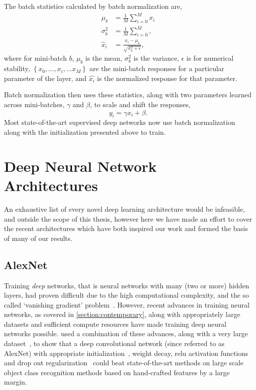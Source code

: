 \documentclass[thesis]{subfiles}
\begin{document}

The batch statistics calculated by batch normalization are,
\begin{equation}
\begin{aligned}
    \mu_b &= \frac{1}{M} \sum^M_{i=0} x_i\\
    \sigma^2_b &= \frac{1}{M} \sum^M_{i=0},\\
    \hat{x}_i &= \frac{x_i - \mu_b}{\sqrt{\sigma^2_b + \epsilon}},
\end{aligned}
\end{equation}
where for mini-batch $b$, $\mu_b$ is the mean, $\sigma^2_b$ is the variance, $\epsilon$ is for numerical stability, $\left\{x_0, \ldots, x_i, \ldots x_M\right\}$ are the mini-batch responses for a particular parameter of the layer, and $\hat{x_i}$ is the normalized response for that parameter. 

Batch normalization then uses these statistics, along with two parameters learned across mini-batches, $\gamma$ and $\beta$, to scale and shift the responses,
\begin{equation}    
    y_i = \gamma \hat{x_i} + \beta.
\end{equation}
%
Most state-of-the-art supervised deep networks now use batch normalization along with the initialization presented above to train.
\section{Deep Neural Network Architectures}
An exhaustive list of every novel deep learning architecture would be infeasible, and outside the scope of this thesis, however here we have made an effort to cover the recent architectures which have both inspired our work and formed the basis of many of our results.

\subsection{AlexNet}
Training \emph{deep} networks, that is neural networks with many (\ie{}two or more) hidden layers, had proven difficult due to the high computational complexity, and the so called `vanishing gradient' problem~\citep{bengio:ieeenn94}. However, recent advances in training neural networks, as covered in \cref{section:contemporary}, along with appropriately large datasets and sufficient compute resources have made training deep neural networks possible. \citet{Krizhevsky2012} used a combination of these advances, along with a very large dataset~\citep{ILSVRC2015}, to show that a deep convolutional network (since referred to as AlexNet) with appropriate initialization~\citep{Sutskever2013momentum}, weight decay, \gls{relu} activation functions~\citep{conf/icml/NairH10} and drop out regularization~\citep{Hinton2012} could beat state-of-the-art methods on large scale object class recognition methods based on hand-crafted features by a large margin. 
\end{document}
